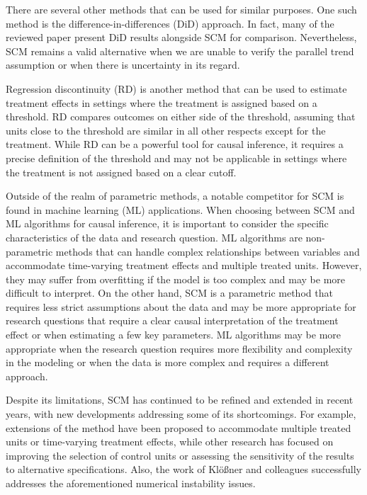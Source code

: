\documentclass[12pt,a4paper,draft]{article}
\begin{document}
There are several other methods that can be used for similar purposes. 
One such method is the difference-in-differences (DiD) approach. 
In fact, many of the reviewed paper present DiD results alongside SCM for comparison. 
Nevertheless, SCM remains a valid alternative when we are unable to verify the 
parallel trend assumption or when there is uncertainty in its regard.

Regression discontinuity (RD) is another method that can be used to estimate treatment 
effects in settings where the treatment is assigned based on a threshold. 
RD compares outcomes on either side of the threshold, assuming that units close to 
the threshold are similar in all other respects except for the treatment. 
While RD can be a powerful tool for causal inference, it requires a precise definition 
of the threshold and may not be applicable in settings where the treatment is not 
assigned based on a clear cutoff. 

Outside of the realm of parametric methods, a notable competitor for SCM is found in 
machine learning (ML) applications.
When choosing between SCM and ML algorithms for causal inference, it is important to 
consider the specific characteristics of the data and research question. 
ML algorithms are non-parametric methods that can handle complex relationships between 
variables and accommodate time-varying treatment effects and multiple treated units. 
However, they may suffer from overfitting if the model is too complex and may be more 
difficult to interpret. 
On the other hand, SCM is a parametric method that requires less strict assumptions about 
the data and may be more appropriate for research questions that require a clear 
causal interpretation of the treatment effect or when estimating a few key parameters. 
ML algorithms may be more appropriate when the research question requires more 
flexibility and complexity in the modeling or when the data is more complex and 
requires a different approach. 


Despite its limitations, SCM has continued to be refined and extended in recent years, 
with new developments addressing some of its shortcomings. 
For example, extensions of the method have been proposed to accommodate multiple 
treated units or time-varying treatment effects, while other research has focused on 
improving the selection of control units or assessing the sensitivity of the results 
to alternative specifications. Also, the work of Klößner and colleagues successfully 
addresses the aforementioned numerical instability issues.
\end{document}
